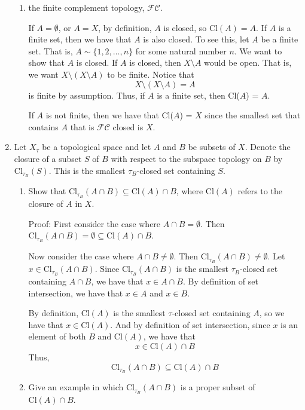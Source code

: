 \documentclass[12pt]{article}
\begin{document}
\begin{enumerate}
\begin{enumerate}
\item the finite complement topology, $\mathcal{FC}$.

If $A = \emptyset$, or $A = X$, by definition, $A$ is closed, so $\text{Cl}(A) = A$. If $A$ is a finite set, then we have that $A$ is also closed. To see this, let $A$ be a finite set. That is, $A \sim \{1,2,\ldots,n\}$ for some natural number $n$. We want to show that $A$ is closed. If $A$ is closed, then $X \setminus A$ would be open. That is, we want $X \setminus (X \setminus A)$ to be finite. Notice that
\[X \setminus (X \setminus A) = A\]
is finite by assumption. Thus, if $A$ is a finite set, then Cl($A$) = $A$.
\newline

If $A$ is not finite, then we have that Cl($A$) = $X$ since the smallest set that contains $A$ that is $\mathcal{FC}$ closed is $X$.
\end{enumerate}

\item Let $X_{\tau}$ be a topological space and let $A$ and $B$ be subsets of $X$. Denote the closure of a subset $S$ of $B$ with respect to the subspace topology on $B$ by $\text{Cl}_{\tau_B}(S)$. This is the smallest $\tau_B$-closed set containing $S$.
\begin{enumerate}
\item Show that $\text{Cl}_{\tau_B}(A\cap B)\subseteq \text{Cl}(A)\cap B$, where $\text{Cl}(A)$ refers to the closure of $A$ in $X$.

Proof: First consider the case where $A \cap B = \emptyset$. Then $\text{Cl}_{\tau_B}(A \cap B) = \emptyset \subseteq \text{Cl}(A) \cap B$.

Now consider the case where $A \cap B \neq \emptyset$. Then $\text{Cl}_{\tau_B}(A \cap B) \neq \emptyset$.
Let $x \in \text{Cl}_{\tau_B}(A \cap B)$. 
Since $\text{Cl}_{\tau_B}(A \cap B)$ is the smallest $\tau_B$-closed set containing $A \cap B$, we have that $x \in A \cap B$. 
By definition of set intersection, we have that $x \in A$ and $x \in B$. 

By definition, $\text{Cl}(A)$ is the smallest $\tau$-closed set containing $A$, so we have that $x \in \text{Cl}(A)$. And by definition of set intersection, since $x$ is an element of both $B$ and $\text{Cl}(A)$, we have that
\[x \in \text{Cl}(A) \cap B\]
Thus,
\[\text{Cl}_{\tau_B}(A \cap B) \subseteq \text{Cl}(A) \cap B\]

\item Give an example in which $\text{Cl}_{\tau_B}(A\cap B)$ is a proper subset of $\text{Cl}(A)\cap B$.


\end{enumerate}
\end{enumerate}
\end{document}

